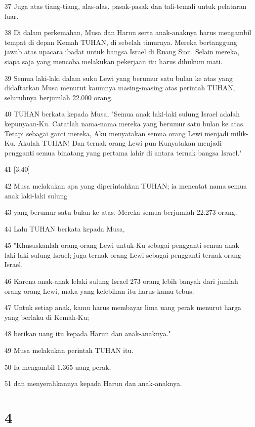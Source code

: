 \par 37 Juga atas tiang-tiang, alas-alas, pasak-pasak dan tali-temali untuk pelataran luar.
\par 38 Di dalam perkemahan, Musa dan Harun serta anak-anaknya harus mengambil tempat di depan Kemah TUHAN, di sebelah timurnya. Mereka bertanggung jawab atas upacara ibadat untuk bangsa Israel di Ruang Suci. Selain mereka, siapa saja yang mencoba melakukan pekerjaan itu harus dihukum mati.
\par 39 Semua laki-laki dalam suku Lewi yang berumur satu bulan ke atas yang didaftarkan Musa menurut kaumnya masing-masing atas perintah TUHAN, seluruhnya berjumlah 22.000 orang.
\par 40 TUHAN berkata kepada Musa, "Semua anak laki-laki sulung Israel adalah kepunyaan-Ku. Catatlah nama-nama mereka yang berumur satu bulan ke atas. Tetapi sebagai ganti mereka, Aku menyatakan semua orang Lewi menjadi milik-Ku. Akulah TUHAN! Dan ternak orang Lewi pun Kunyatakan menjadi pengganti semua binatang yang pertama lahir di antara ternak bangsa Israel."
\par 41 [3:40]
\par 42 Musa melakukan apa yang diperintahkan TUHAN; ia mencatat nama semua anak laki-laki sulung
\par 43 yang berumur satu bulan ke atas. Mereka semua berjumlah 22.273 orang.
\par 44 Lalu TUHAN berkata kepada Musa,
\par 45 "Khususkanlah orang-orang Lewi untuk-Ku sebagai pengganti semua anak laki-laki sulung Israel; juga ternak orang Lewi sebagai pengganti ternak orang Israel.
\par 46 Karena anak-anak lelaki sulung Israel 273 orang lebih banyak dari jumlah orang-orang Lewi, maka yang kelebihan itu harus kamu tebus.
\par 47 Untuk setiap anak, kamu harus membayar lima uang perak menurut harga yang berlaku di Kemah-Ku;
\par 48 berikan uang itu kepada Harun dan anak-anaknya."
\par 49 Musa melakukan perintah TUHAN itu.
\par 50 Ia mengambil 1.365 uang perak,
\par 51 dan menyerahkannya kepada Harun dan anak-anaknya.

\chapter{4}

